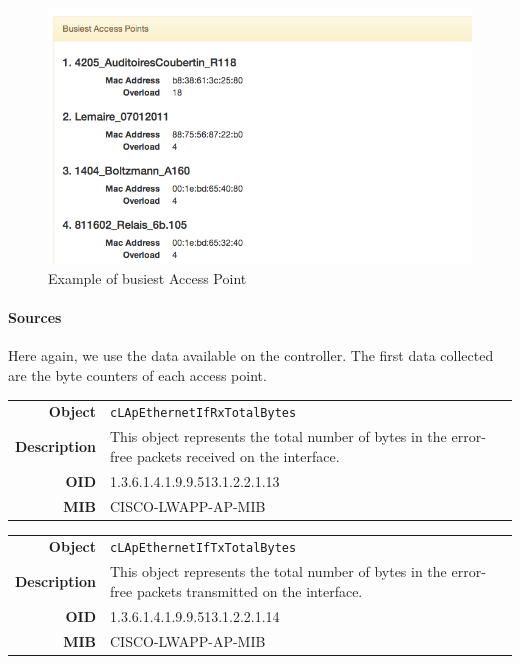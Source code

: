 \begin{figure}[H]
   \includegraphics[width=\textwidth]{Pictures/chapter5/busiestAP.png}
   \caption{Example of busiest Access Point}
\end{figure}

\paragraph*{Sources} Here again, we use the data available on the controller. The first data collected are the byte counters of each access point.

\begin{tabular}{|r l|}
\hline
\textbf{Object} & \texttt{cLApEthernetIfRxTotalBytes} \\
\textbf{Description} & \parbox{11cm}{This object represents the total number of bytes in the error-free packets received on the interface.} \\
\textbf{OID} & 1.3.6.1.4.1.9.9.513.1.2.2.1.13 \\
\textbf{MIB} & CISCO-LWAPP-AP-MIB \\
\hline
\end{tabular}

\begin{tabular}{|r l|}
\hline
\textbf{Object} & \texttt{cLApEthernetIfTxTotalBytes} \\
\textbf{Description} & \parbox{11cm}{This object represents the total number of bytes in the error-free packets transmitted on the interface.} \\
\textbf{OID} & 1.3.6.1.4.1.9.9.513.1.2.2.1.14 \\
\textbf{MIB} & CISCO-LWAPP-AP-MIB \\
\hline
\end{tabular}

